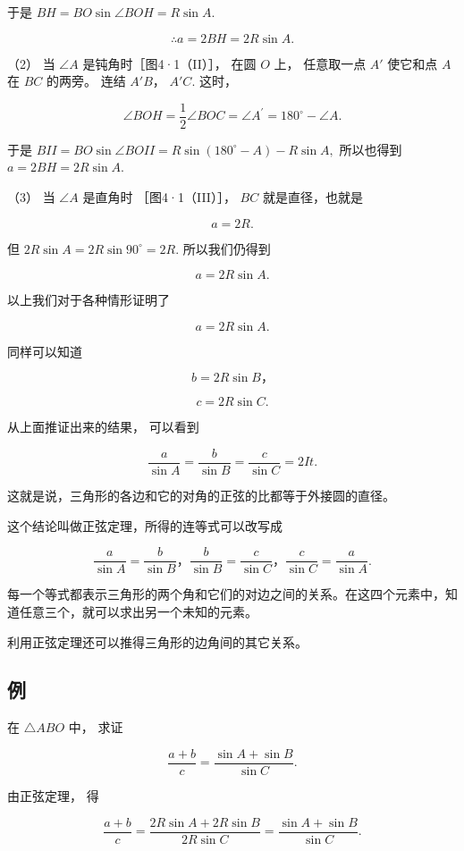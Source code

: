 于是 \(BH = BO\sin \angle BOH = R\sin A.\)

\[
\therefore a = 2 B H = 2 R \sin A.
\]

（2） 当 \(\angle A\) 是钝角时［图4·1（II）］， 在圆 \(O\) 上，
任意取一点 \(A'\) 使它和点 \(A\) 在 \(BC\) 的两旁。 连结 \(A'B\)，
\(A'C\). 这时，

\[
\angle B O H = \frac {1}{2} \angle B O C = \angle A ^{\prime} = 180 ^{\circ} - \angle A.
\]

于是 \(BII = BO\sin \angle BOII = R\sin (180^{\circ} - A) - R\sin A,\)
所以也得到 \(a = 2BH = 2R\sin A.\)

（3） 当 \(\angle A\) 是直角时 ［图4·1（III）］， \(BC\)
就是直径，也就是

\[
a = 2 R.
\]

但 \(2R\sin A = 2R\sin 90^{\circ} = 2R.\) 所以我们仍得到

\[
a = 2 R \sin A.
\]

以上我们对于各种情形证明了

\[
a = 2 R \sin A.
\]

同样可以知道

\[
b = 2 R \sin B\text{，}
\]

\[
c = 2 R \sin C.
\]

从上面推证出来的结果， 可以看到

\[
\frac {a}{\sin A} = \frac {b}{\sin B} = \frac {c}{\sin C} = 2 I t.
\]

这就是说，三角形的各边和它的对角的正弦的比都等于外接圆的直径。

这个结论叫做正弦定理，所得的连等式可以改写成

\[
\frac {a}{\sin A} = \frac {b}{\sin B}\text{，} \frac {b}{\sin B} = \frac {c}{\sin C}\text{，} \frac {c}{\sin C} = \frac {a}{\sin A}.
\]

每一个等式都表示三角形的两个角和它们的对边之间的关系。在这四个元素中，知道任意三个，就可以求出另一个未知的元素。

利用正弦定理还可以推得三角形的边角间的其它关系。

\subsection{例}

在 \(\triangle ABO\) 中， 求证

\[
\frac {a + b}{c} = \frac {\sin A + \sin B}{\sin C}.
\]

 由正弦定理， 得

\[
\frac {a + b}{c} = \frac {2 R \sin A + 2 R \sin B}{2 R \sin C} = \frac {\sin A + \sin B}{\sin C}.
\]

